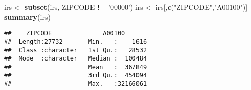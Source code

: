 \documentclass[]{article}
\newenvironment{Shaded}{\begin{snugshade}}{\end{snugshade}}
\newcommand{\KeywordTok}[1]{\textcolor[rgb]{0.13,0.29,0.53}{\textbf{#1}}}
\newcommand{\StringTok}[1]{\textcolor[rgb]{0.31,0.60,0.02}{#1}}
\newcommand{\OperatorTok}[1]{\textcolor[rgb]{0.81,0.36,0.00}{\textbf{#1}}}
\newcommand{\NormalTok}[1]{#1}
\begin{document}
\begin{Shaded}
\begin{Highlighting}[]
\NormalTok{irs <-}\StringTok{ }\KeywordTok{subset}\NormalTok{(irs, ZIPCODE }\OperatorTok{!=}\StringTok{ '00000'}\NormalTok{)}
\NormalTok{irs <-}\StringTok{ }\NormalTok{irs[,}\KeywordTok{c}\NormalTok{(}\StringTok{"ZIPCODE"}\NormalTok{,}\StringTok{"A00100"}\NormalTok{)]}
\KeywordTok{summary}\NormalTok{(irs)}
\end{Highlighting}
\end{Shaded}

\begin{verbatim}
##    ZIPCODE              A00100        
##  Length:27732       Min.   :    1616  
##  Class :character   1st Qu.:   28532  
##  Mode  :character   Median :  100484  
##                     Mean   :  367849  
##                     3rd Qu.:  454094  
##                     Max.   :32166061
\end{verbatim}

\begin{Shaded}
\end{Shaded}
\end{document}
